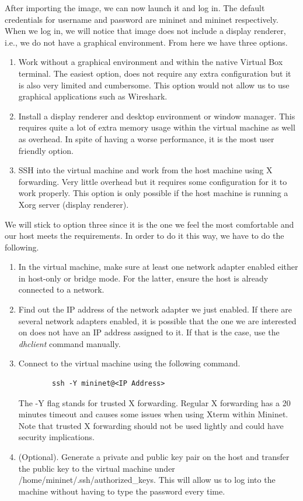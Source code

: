 After importing the image, we can now launch it and log in. The default credentials for username and password are mininet and mininet respectively. When we log in, we will notice that image does not include a display renderer, i.e., we do not have a graphical environment. From here we have three options.
\begin{enumerate}
    \item Work without a graphical environment and within the native Virtual Box terminal. The easiest option, does not require any extra configuration but it is also very limited and cumbersome. This option would not allow us to use graphical applications such as Wireshark.
    
    \item Install a display renderer and desktop environment or window manager. This requires quite a lot of extra memory usage within the virtual machine as well as overhead. In spite of having a worse performance, it is the most user friendly option.
    
    \item SSH into the virtual machine and work from the host machine using X forwarding. Very little overhead but it requires some configuration for it to work properly. This option is only possible if the host machine is running a Xorg server (display renderer).
\end{enumerate}

We will stick to option three since it is the one we feel the most comfortable and our host meets the requirements. In order to do it this way, we have to do the following.
\begin{enumerate}
    \item In the virtual machine, make sure at least one network adapter enabled either in host-only or bridge mode. For the latter, ensure the host is already connected to a network.
    
    \item Find out the IP address of the network adapter we just enabled. If there are several network adapters enabled, it is possible that the one we are interested on does not have an IP address assigned to it. If that is the case, use the \textit{dhclient} command manually.
    
    \item Connect to the virtual machine using the following command.
    \begin{lstlisting}
        ssh -Y mininet@<IP Address>
    \end{lstlisting}
    
    The -Y flag stands for trusted X forwarding. Regular X forwarding has a 20 minutes timeout and causes some issues when using Xterm within Mininet. Note that trusted X forwarding should not be used lightly and could have security implications.
    
    \item (Optional). Generate a private and public key pair on the host and transfer the public key to the virtual machine under \\ /home/mininet/.ssh/authorized\_keys. This will allow us to log into the machine without having to type the password every time.
\end{enumerate}

